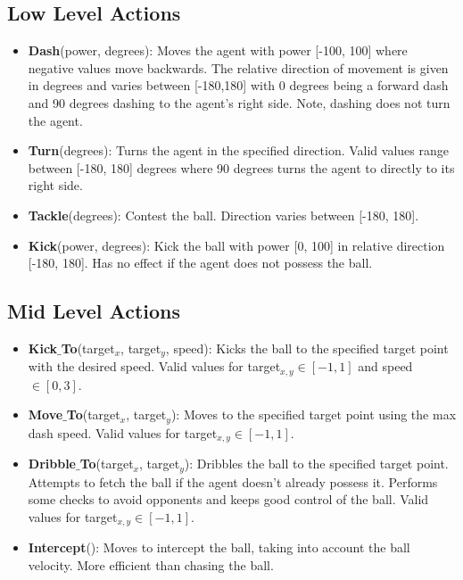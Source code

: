 \documentclass[12pt]{article}
\begin{document}
\subsection{Low Level Actions}
\label{sec:low_level_actions}
\begin{itemize}
\item{\textbf{Dash}(power, degrees): Moves the agent with power [-100,
    100] where negative values move backwards. The relative direction
  of movement is given in degrees and varies between [-180,180] with 0
  degrees being a forward dash and 90 degrees dashing to the agent's
  right side. Note, dashing does not turn the agent.}
\item{\textbf{Turn}(degrees): Turns the agent in the
  specified direction. Valid values range between [-180, 180] degrees
  where 90 degrees turns the agent to directly to its right side.}
\item{\textbf{Tackle}(degrees): Contest the ball. Direction
  varies between [-180, 180].}
\item{\textbf{Kick}(power, degrees): Kick the ball with power [0, 100]
  in relative direction [-180, 180]. Has no effect if the agent does
  not possess the ball.}
\end{itemize}

\subsection{Mid Level Actions}
\label{sec:mid_level_actions}
\begin{itemize}
\item{\textbf{Kick$\_$To}(target$_x$, target$_y$, speed): Kicks the
  ball to the specified target point with the desired speed. Valid
  values for target$_{x,y} \in [-1,1]$ and speed $\in [0,3]$.}
\item{\textbf{Move$\_$To}(target$_x$, target$_y$): Moves to the
  specified target point using the max dash speed. Valid values for
  target$_{x,y} \in [-1,1]$.}
\item{\textbf{Dribble$\_$To}(target$_x$, target$_y$): Dribbles the
  ball to the specified target point. Attempts to fetch the ball if
  the agent doesn't already possess it. Performs some checks to avoid
  opponents and keeps good control of the ball. Valid values for
  target$_{x,y} \in [-1,1]$.}
\item{\textbf{Intercept}(): Moves to intercept the ball, taking into
  account the ball velocity. More efficient than chasing the ball.}
\end{itemize}
\end{document}
